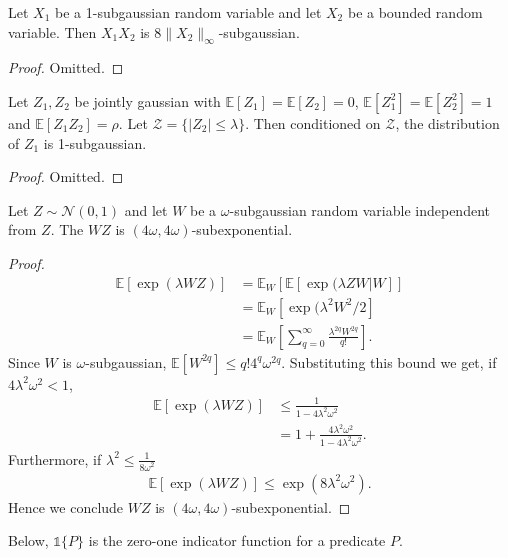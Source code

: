 \documentclass[final,12pt]{colt2018} %
\newcommand{\E}{\mathbb{E}}
\newcommand{\gauss}[2]{\mathcal{N}\left( #1,#2 \right)}
\newcommand{\indicator}[1]{\mathds{1}\{#1\}}
\begin{document}
\begin{lemma} Let $X_1$ be a 1-subgaussian random variable and let $X_2$ be a bounded random variable. Then $X_1 X_2$ is $8\|X_2\|_\infty$-subgaussian.
\label{lemma: prod_gauss_bounded}
\end{lemma}
\begin{proof}
Omitted.
\end{proof}
\begin{lemma} Let $Z_1,Z_2$ be jointly gaussian with $\E[Z_1]=\E[Z_2]=0$, $\E[Z_1^2] = \E[Z_2^2] =1$ and $\E[Z_1 Z_2] = \rho$. Let $\mathcal{Z} = \{ |Z_2| \leq \lambda\}$. Then conditioned on $\mathcal{Z}$, the distribution of $Z_1$ is 1-subgaussian. 
\label{lemma: subgauss_conditioning}
\end{lemma}
\begin{proof}
Omitted.
\end{proof}
\begin{lemma} Let $Z \sim \gauss{0}{1}$ and let $W$ be a $\omega$-subgaussian random variable independent from $Z$. The $WZ$ is $(4\omega,4\omega)$-subexponential. 
\label{lemma: prod_gauss_gauss}
\end{lemma}
\begin{proof}

\begin{align*}
    \E[\exp(\lambda WZ)] & = \E_{W}[\E[\exp(\lambda ZW| W]] \\
    & = \E_{W}[\exp(\lambda^2 W^2/2] \\
    & = \E_W \left[ \sum_{q=0}^\infty \frac{\lambda^{2q} W^{2q}}{q!} \right].
\end{align*}
Since $W$ is $\omega$-subgaussian, $\E[W^{2q}] \leq q! 4^q \omega^{2q}$. Substituting this bound we get, if $4 \lambda ^2 \omega^2 < 1 $,
\begin{align*}
    \E[\exp(\lambda WZ)] &\leq \frac{1}{1-4\lambda^2\omega^2} \\
    & = 1 + \frac{4\lambda^2 \omega^2}{1-4 \lambda^2 \omega^2}.
\end{align*}
Furthermore, if $\lambda^2 \leq \frac{1}{8 \omega^2}$
\begin{align*}
    \E[\exp(\lambda WZ)] \leq \exp(8 \lambda^2 \omega^2).
\end{align*}
Hence we conclude $WZ$ is $(4\omega,4\omega)$-subexponential. 
\end{proof}

Below, $\indicator{P}$ is the zero-one indicator function for a predicate $P$.
\end{document}
